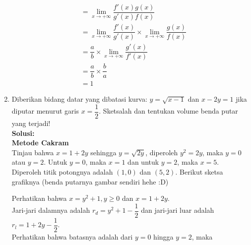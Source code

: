 \documentclass{article}
\begin{document}
\begin{enumerate}
\begin{align*}
	&= \lim_{x\rightarrow +\infty} \dfrac{f'(x)g(x)}{g'(x)f(x)}\\
	&= \lim_{x\rightarrow +\infty} \dfrac{f'(x)}{g'(x)}\times \lim_{x\rightarrow +\infty} \dfrac{g(x)}{f(x)} \\
	&= \dfrac{a}{b}\times \lim_{x\rightarrow +\infty} \dfrac{g'(x)}{f'(x)}\\
	&= \dfrac{a}{b}\times \dfrac{b}{a}\\
	&= 1
	\end{align*}
	\item Diberikan bidang datar yang dibatasi kurva: $y=\sqrt{x-1}$ dan $x-2y=1$ jika diputar menurut garis $x=\dfrac{1}{2}$. Sketsalah dan tentukan volume benda putar yang terjadi!\\
	\textbf{Solusi:}\\
	\textbf{Metode Cakram}\\
	Tinjau bahwa $x=1+2y$ sehingga $y=\sqrt{2y}$, diperoleh $y^2=2y$, maka $y=0$ atau $y=2$. Untuk $y=0$, maka $x=1$ dan untuk $y=2$, maka $x=5$. Diperoleh titik potongnya adalah $(1,0)$ dan $(5,2)$. Berikut sketsa grafiknya (benda putarnya gambar sendiri hehe :D) 
	\begin{center}
		\end{center}
	Perhatikan bahwa $x=y^2+1,y\geq 0$ dan $x=1+2y$. \\Jari-jari dalamnya adalah $r_d=y^2+1-\dfrac{1}{2}$ dan jari-jari luar adalah $r_l=1+2y-\dfrac{1}{2}$.\\
	Perhatikan bahwa batasnya adalah dari $y=0$ hingga $y=2$, maka 
	\begin{align*}

\end{align*}
\end{enumerate}
\end{document}
